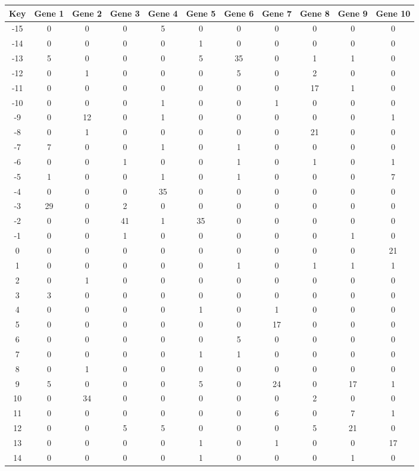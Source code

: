 \begin{tabular}{|c|c|c|c|c|c|c|c|c|c|c|}
\hline
Key & Gene 1 & Gene 2 & Gene 3 & Gene 4 & Gene 5 & Gene 6 & Gene 7 & Gene 8 & Gene 9 & Gene 10 \\
\hline
-15 & 0 & 0 & 0 & 5 & 0 & 0 & 0 & 0 & 0 & 0 \\
-14 & 0 & 0 & 0 & 0 & 1 & 0 & 0 & 0 & 0 & 0 \\
-13 & 5 & 0 & 0 & 0 & 5 & 35 & 0 & 1 & 1 & 0 \\
-12 & 0 & 1 & 0 & 0 & 0 & 5 & 0 & 2 & 0 & 0 \\
-11 & 0 & 0 & 0 & 0 & 0 & 0 & 0 & 17 & 1 & 0 \\
-10 & 0 & 0 & 0 & 1 & 0 & 0 & 1 & 0 & 0 & 0 \\
-9 & 0 & 12 & 0 & 1 & 0 & 0 & 0 & 0 & 0 & 1 \\
-8 & 0 & 1 & 0 & 0 & 0 & 0 & 0 & 21 & 0 & 0 \\
-7 & 7 & 0 & 0 & 1 & 0 & 1 & 0 & 0 & 0 & 0 \\
-6 & 0 & 0 & 1 & 0 & 0 & 1 & 0 & 1 & 0 & 1 \\
-5 & 1 & 0 & 0 & 1 & 0 & 1 & 0 & 0 & 0 & 7 \\
-4 & 0 & 0 & 0 & 35 & 0 & 0 & 0 & 0 & 0 & 0 \\
-3 & 29 & 0 & 2 & 0 & 0 & 0 & 0 & 0 & 0 & 0 \\
-2 & 0 & 0 & 41 & 1 & 35 & 0 & 0 & 0 & 0 & 0 \\
-1 & 0 & 0 & 1 & 0 & 0 & 0 & 0 & 0 & 1 & 0 \\
0 & 0 & 0 & 0 & 0 & 0 & 0 & 0 & 0 & 0 & 21 \\
1 & 0 & 0 & 0 & 0 & 0 & 1 & 0 & 1 & 1 & 1 \\
2 & 0 & 1 & 0 & 0 & 0 & 0 & 0 & 0 & 0 & 0 \\
3 & 3 & 0 & 0 & 0 & 0 & 0 & 0 & 0 & 0 & 0 \\
4 & 0 & 0 & 0 & 0 & 1 & 0 & 1 & 0 & 0 & 0 \\
5 & 0 & 0 & 0 & 0 & 0 & 0 & 17 & 0 & 0 & 0 \\
6 & 0 & 0 & 0 & 0 & 0 & 5 & 0 & 0 & 0 & 0 \\
7 & 0 & 0 & 0 & 0 & 1 & 1 & 0 & 0 & 0 & 0 \\
8 & 0 & 1 & 0 & 0 & 0 & 0 & 0 & 0 & 0 & 0 \\
9 & 5 & 0 & 0 & 0 & 5 & 0 & 24 & 0 & 17 & 1 \\
10 & 0 & 34 & 0 & 0 & 0 & 0 & 0 & 2 & 0 & 0 \\
11 & 0 & 0 & 0 & 0 & 0 & 0 & 6 & 0 & 7 & 1 \\
12 & 0 & 0 & 5 & 5 & 0 & 0 & 0 & 5 & 21 & 0 \\
13 & 0 & 0 & 0 & 0 & 1 & 0 & 1 & 0 & 0 & 17 \\
14 & 0 & 0 & 0 & 0 & 1 & 0 & 0 & 0 & 1 & 0 \\
\hline
\end{tabular}